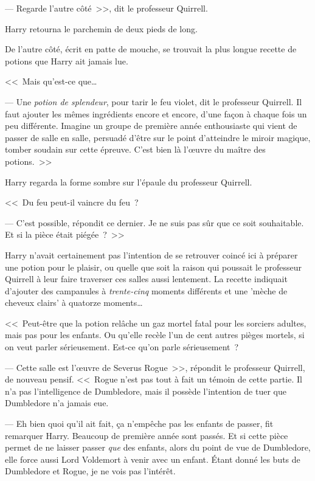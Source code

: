 --- Regarde l'autre côté~>>, dit le professeur Quirrell.

Harry retourna le parchemin de deux pieds de long.

De l'autre côté, écrit en patte de mouche, se trouvait la plus longue recette de potions que Harry ait jamais lue.

<<~Mais qu'est-ce que…

--- Une \emph{potion de splendeur}, pour tarir le feu violet, dit le professeur Quirrell. Il faut ajouter les mêmes ingrédients encore et encore, d'une façon à chaque fois un peu différente. Imagine un groupe de première année enthousiaste qui vient de passer de salle en salle, persuadé d'être sur le point d'atteindre le miroir magique, tomber soudain sur cette épreuve. C'est bien là l'œuvre du maître des potions.~>>

Harry regarda la forme sombre sur l'épaule du professeur Quirrell.

<<~Du feu peut-il vaincre du feu~?

--- C'est possible, répondit ce dernier. Je ne suis pas sûr que ce soit souhaitable. Et si la pièce était piégée~?~>>

Harry n'avait certainement pas l'intention de se retrouver coincé ici à préparer une potion pour le plaisir, ou quelle que soit la raison qui poussait le professeur Quirrell à leur faire traverser ces salles aussi lentement. La recette indiquait d'ajouter des campanules à \emph{trente-cinq} moments différents et une 'mèche de cheveux clairs' à quatorze moments…

<<~Peut-être que la potion relâche un gaz mortel fatal pour les sorciers adultes, mais pas pour les enfants. Ou qu'elle recèle l'un de cent autres pièges mortels, si on veut parler sérieusement. Est-ce qu'on parle sérieusement~?

--- Cette salle est l'œuvre de Severus Rogue~>>, répondit le professeur Quirrell, de nouveau pensif. <<~Rogue n'est pas tout à fait un témoin de cette partie. Il n'a pas l'intelligence de Dumbledore, mais il possède l'intention de tuer que Dumbledore n'a jamais eue.

--- Eh bien quoi qu'il ait fait, ça n'empêche pas les enfants de passer, fit remarquer Harry. Beaucoup de première année sont passés. Et si cette pièce permet de ne laisser passer \emph{que} des enfants, alors du point de vue de Dumbledore, elle force aussi Lord Voldemort à venir avec un enfant. Étant donné les buts de Dumbledore et Rogue, je ne vois pas l'intérêt.

